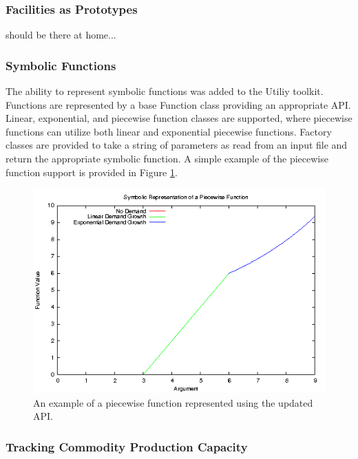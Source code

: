 \subsubsection{Facilities as Prototypes}
should be there at home...

\subsubsection{Symbolic Functions}

The ability to represent symbolic functions was added to the \Cyclus Utiliy
toolkit. Functions are represented by a base Function class providing an
appropriate API. Linear, exponential, and piecewise function classes are
supported, where piecewise functions can utilize both linear and exponential
piecewise functions. Factory classes are provided to take a string of parameters
as read from an input file and return the appropriate symbolic function. A
simple example of the piecewise function support is provided in Figure
\ref{fig:piecewise}.

\begin{figure}[H]
  \begin{center}
    \includegraphics[width=\linewidth]{./chapters/prevwork/piecewise.png}
  \caption{An example of a piecewise function represented using the updated API.}
  \label{fig:piecewise}
  \end{center}
\end{figure}

\subsubsection{Tracking Commodity Production Capacity}

